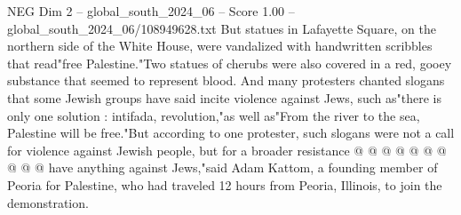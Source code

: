 \begin{textsample}{NEG Dim 2 – global\_south\_2024\_06 – Score 1.00 – global\_south\_2024\_06/108949628.txt}
But statues in Lafayette Square, on the northern side of the White House, were vandalized with handwritten scribbles that read"free Palestine."Two statues of cherubs were also covered in a red, gooey substance that seemed to represent blood.
And many protesters chanted slogans that some Jewish groups have said incite violence against Jews, such as"there is only one solution : intifada, revolution,"as well as"From the river to the sea, Palestine will be free."But according to one protester, such slogans were not a call for violence against Jewish people, but for a broader resistance @ @ @ @ @ @ @ @ @ @ have anything against Jews,"said Adam Kattom, a founding member of Peoria for Palestine, who had traveled 12 hours from Peoria, Illinois, to join the demonstration.

\end{textsample}
